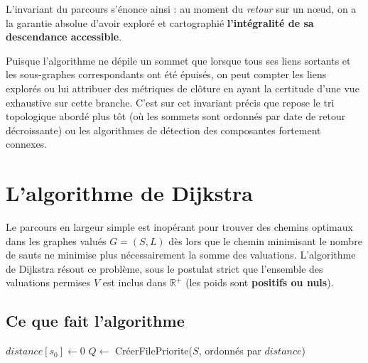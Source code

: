 \documentclass[11pt,a4paper]{report}
\begin{document}
	L'invariant du parcours s'énonce ainsi : au moment du \textit{retour} sur un nœud, on a la garantie absolue d'avoir exploré et cartographié \textbf{l'intégralité de sa descendance accessible}. 
	
	Puisque l'algorithme ne dépile un sommet que lorsque tous ses liens sortants et les sous-graphes correspondants ont été épuisés, on peut compter les liens explorés ou lui attribuer des métriques de clôture en ayant la certitude d'une vue exhaustive sur cette branche. C'est sur cet invariant précis que repose le tri topologique abordé plus tôt (où les sommets sont ordonnés par date de retour décroissante) ou les algorithmes de détection des composantes fortement connexes.
	
	\section{L'algorithme de Dijkstra}
	
	Le parcours en largeur simple est inopérant pour trouver des chemins optimaux dans les graphes valués $G=(S,L)$ dès lors que le chemin minimisant le nombre de sauts ne minimise plus nécessairement la somme des valuations. L'algorithme de Dijkstra résout ce problème, sous le postulat strict que l'ensemble des valuations permises $V$ est inclus dans $\mathbb{R}^+$ (les poids sont \textbf{positifs ou nuls}).
	
	\subsection{Ce que fait l'algorithme}
	
	\begin{algorithm}[htbp]
		\DontPrintSemicolon
		\BlankLine
		
		$distance[s_{0}] \leftarrow 0$\;
		$Q \leftarrow$ CréerFilePriorite($S$, ordonnés par $distance$)\;
		\BlankLine
		
		\BlankLine
		
		\;
		\caption{Algorithme de Dijkstra}
	\end{algorithm}
	
\end{document}
